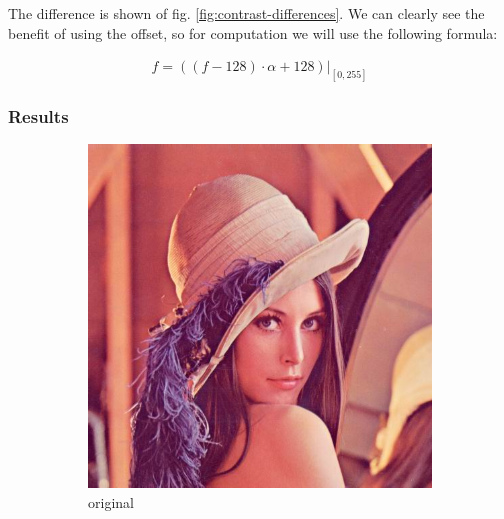 \documentclass[12pt]{article}
\theoremstyle{definition}
\newcommand{\subfiguresize}{.3\textwidth}
\begin{document}
The difference is shown of fig. \ref{fig:contrast-differences}.
We can clearly see the benefit of using the offset, so for computation we will use the following formula:

\begin{equation}
    \hat{f} = \left((f - 128) \cdot \alpha + 128\right)\Big|_{[0,255]}
\end{equation}

\subsubsection{Results}

\begin{figure}[H]\centering
    \begin{subfigure}[t]{\subfiguresize}\centering
        \includegraphics[width=\textwidth]{lenac.png}
        \caption{original}
    \end{subfigure}
    \hspace{.05\textwidth}
    \begin{subfigure}[t]{\subfiguresize}\centering

\end{subfigure}
\end{figure}
\end{document}
